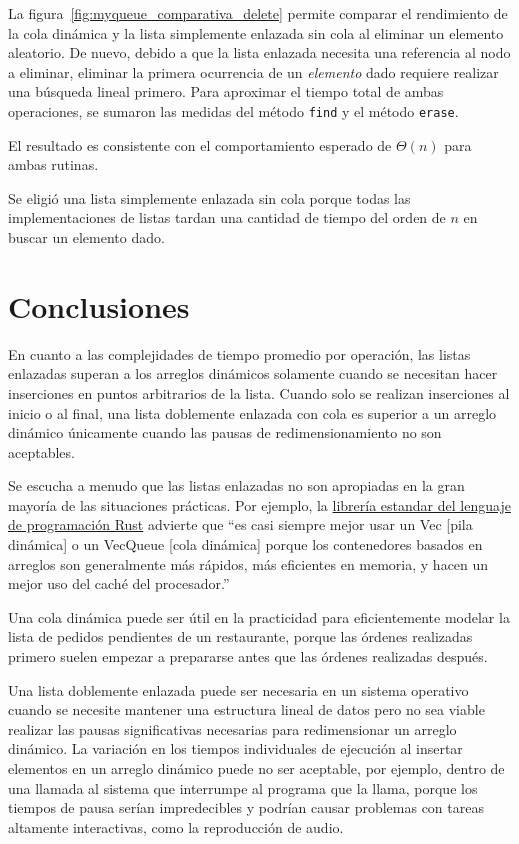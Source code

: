La figura~\ref{fig:myqueue_comparativa_delete} permite comparar el rendimiento de la cola dinámica y la lista simplemente enlazada sin cola al eliminar un elemento aleatorio. De nuevo, debido a que la lista enlazada necesita una referencia al nodo a eliminar, eliminar la primera ocurrencia de un \emph{elemento} dado requiere realizar una búsqueda lineal primero. Para aproximar el tiempo total de ambas operaciones, se sumaron las medidas del método \texttt{find} y el método \texttt{erase}.

El resultado es consistente con el comportamiento esperado de $\Theta{}(n)$ para ambas rutinas.

Se eligió una lista simplemente enlazada sin cola porque todas las implementaciones de listas tardan una cantidad de tiempo del orden de $n$ en buscar un elemento dado.

\section{Conclusiones}

En cuanto a las complejidades de tiempo promedio por operación, las listas enlazadas superan a los arreglos dinámicos solamente cuando se necesitan hacer inserciones en puntos arbitrarios de la lista. Cuando solo se realizan inserciones al inicio o al final, una lista doblemente enlazada con cola es superior a un arreglo dinámico únicamente cuando las pausas de redimensionamiento no son aceptables.

Se escucha a menudo que las listas enlazadas no son apropiadas en la gran mayoría de las situaciones prácticas. Por ejemplo, la \href{https://doc.rust-lang.org/std/collections/struct.LinkedList.html}{librería estandar del lenguaje de programación Rust} advierte que ``es casi siempre mejor usar un Vec [pila dinámica] o un VecQueue [cola dinámica] porque los contenedores basados en arreglos son generalmente más rápidos, más eficientes en memoria, y hacen un mejor uso del caché del procesador.''

Una cola dinámica puede ser útil en la practicidad para eficientemente modelar la lista de pedidos pendientes de un restaurante, porque las órdenes realizadas primero suelen empezar a prepararse antes que las órdenes realizadas después.

Una lista doblemente enlazada puede ser necesaria en un sistema operativo cuando se necesite mantener una estructura lineal de datos pero no sea viable realizar las pausas significativas necesarias para redimensionar un arreglo dinámico. La variación en los tiempos individuales de ejecución al insertar elementos en un arreglo dinámico puede no ser aceptable, por ejemplo, dentro de una llamada al sistema que interrumpe al programa que la llama, porque los tiempos de pausa serían impredecibles y podrían causar problemas con tareas altamente interactivas, como la reproducción de audio.

